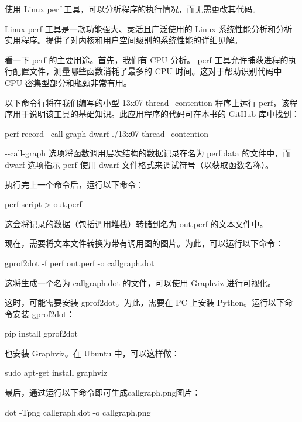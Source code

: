 使用 Linux perf 工具，可以分析程序的执行情况，而无需更改其代码。

Linux perf 工具是一款功能强大、灵活且广泛使用的 Linux 系统性能分析和分析实用程序。提供了对内核和用户空间级别的系统性能的详细见解。

看一下 perf 的主要用途。首先，我们有 CPU 分析。 perf 工具允许捕获进程的执行配置文件，测量哪些函数消耗了最多的 CPU 时间。这对于帮助识别代码中 CPU 密集型部分和瓶颈非常有用。

以下命令行将在我们编写的小型 13x07-thread\_contention 程序上运行 perf，该程序用于说明该工具的基础知识。此应用程序的代码可在本书的 GitHub 库中找到：

\begin{shell}
perf record --call-graph dwarf ./13x07-thread_contention
\end{shell}

-{}-call-graph 选项将函数调用层次结构的数据记录在名为 perf.data 的文件中，而 dwarf 选项指示 perf 使用 dwarf 文件格式来调试符号（以获取函数名称）。

执行完上一个命令后，运行以下命令：

\begin{shell}
perf script > out.perf
\end{shell}

这会将记录的数据（包括调用堆栈）转储到名为 out.perf 的文本文件中。

现在，需要将文本文件转换为带有调用图的图片。为此，可以运行以下命令：

\begin{shell}
gprof2dot -f perf out.perf -o callgraph.dot
\end{shell}

这将生成一个名为 callgraph.dot 的文件，可以使用 Graphviz 进行可视化。

这时，可能需要安装 gprof2dot。为此，需要在 PC 上安装 Python。运行以下命令安装 gprof2dot：

\begin{shell}
pip install gprof2dot
\end{shell}

也安装 Graphviz。在 Ubuntu 中，可以这样做：

\begin{shell}
sudo apt-get install graphviz
\end{shell}

最后，通过运行以下命令即可生成callgraph.png图片：

\begin{shell}
dot -Tpng callgraph.dot -o callgraph.png
\end{shell}

